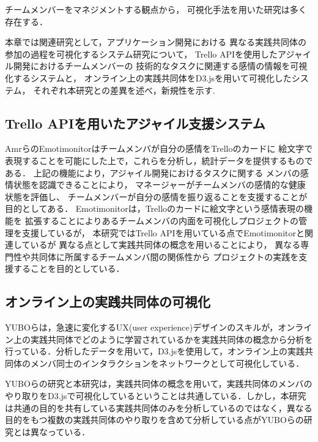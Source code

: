 

チームメンバーをマネジメントする観点から，
可視化手法を用いた研究は多く存在する．

本章では関連研究として，アプリケーション開発における
異なる実践共同体の参加の過程を可視化するシステム研究について，
Trello APIを使用したアジャイル開発におけるチームメンバーの
技術的なタスクに関連する感情の情報を可視化するシステムと，
オンライン上の実践共同体をD3.jsを用いて可視化したシステム，
それぞれ本研究との差異を述べ，新規性を示す.

\subsection{Trello APIを用いたアジャイル支援システム}
AmrらのEmotimonitorはチームメンバが自分の感情をTrelloのカードに
絵文字で表現することを可能にした上で，これらを分析し，統計データを提供するものである．
上記の機能により，アジャイル開発におけるタスクに関する
メンバの感情状態を認識できることにより，
マネージャーがチームメンバの感情的な健康状態を評価し、
チームメンバーが自分の感情を振り返ることを支援することが目的としてある．
Emotimonitorは，Trelloのカードに絵文字という感情表現の機能を
拡張することによりあるチームメンバの内面を可視化しプロジェクトの管理を支援しているが，
本研究ではTrello APIを用いている点でEmotimonitorと関連しているが
異なる点として実践共同体の概念を用いることにより，
異なる専門性や共同体に所属するチームメンバ間の関係性から
プロジェクトの実践を支援することを目的としている．　　　

\subsection{オンライン上の実践共同体の可視化}
YUBOらは，急速に変化するUX(user experience)デザインのスキルが，オンライン上の実践共同体でどのように学習されているかを実践共同体の概念から分析を行っている．分析したデータを用いて，D3.jsを使用して，オンライン上の実践共同体のメンバ同士のインタラクションをネットワークとして可視化している．

YUBOらの研究と本研究は，実践共同体の概念を用いて，実践共同体のメンバのやり取りをD3.jsで可視化しているということは共通している．しかし，本研究は共通の目的を共有している実践共同体のみを分析しているのではなく，異なる目的をもつ複数の実践共同体のやり取りを含めて分析している点がYUBOらの研究とは異なっている．